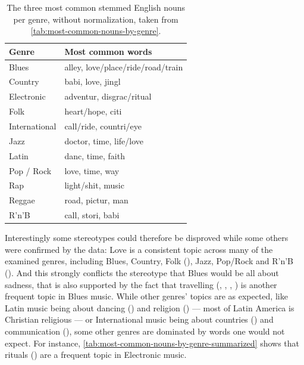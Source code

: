\documentclass[                                                             %
        12pt,                                                                   %
        twoside                                                                 %
    ]{scrartcl}                                                                 %
\begin{document}
\begin{table}
    \caption[The three most common stemmed English nouns per genre.]{%
        The three most common stemmed English nouns per genre, 
        without normalization,
        taken from \autoref{tab:most-common-nouns-by-genre}.
    }
    \label{tab:most-common-nouns-by-genre-summarized}
    \centering
    \begin{tabu} spread 0.9\linewidth {l l}
    	\toprule
    	Genre         & Most common words                 \\ \midrule
    	Blues         & alley, love/place/ride/road/train \\
    	Country       & babi, love, jingl                 \\
    	Electronic    & adventur, disgrac/ritual          \\
    	Folk          & heart/hope, citi                  \\
    	International & call/ride, countri/eye            \\
    	Jazz          & doctor, time, life/love           \\
    	Latin         & danc, time, faith                 \\
    	Pop / Rock    & love, time, way                   \\
    	Rap           & light/shit, music                 \\
    	Reggae        & road, pictur, man                 \\
    	R'n'B         & call, stori, babi                 \\ \bottomrule
    \end{tabu}
\end{table}

Interestingly some stereotypes could therefore be disproved 
while some others were confirmed by the data:
Love is a consistent topic across many of the examined genres, 
including Blues, Country, Folk (), 
Jazz, Pop/Rock and R'n'B ().
And this strongly conflicts the stereotype 
that Blues would be all about sadness,
that is also supported by the fact that 
travelling (, , 
, ) is 
another frequent topic in Blues music.
While other genres' topics are as expected,
like Latin music being about dancing () 
and religion () --- most of Latin America 
is Christian religious \parencite{pew2015global} --- or 
International music being about countries () 
and communication (),
some other genres are dominated by words one would not expect.
For instance, \autoref{tab:most-common-nouns-by-genre-summarized} shows 
that rituals () are a frequent topic 
in Electronic music.
\end{document}
